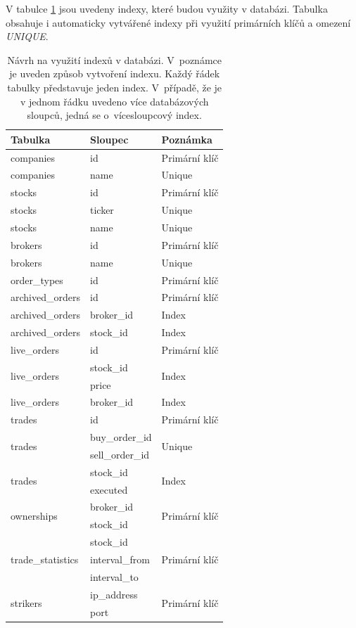\documentclass[thesis=M,czech]{FITthesis}[2012/06/26]
\begin{document}
V tabulce \ref{tab:dbindexes} jsou uvedeny indexy, které budou využity v databázi. Tabulka obsahuje i automaticky vytvářené indexy při využití 
primárních klíčů a omezení \textit{UNIQUE}.

\begin{table}\centering
	\begin{tabular}{| l | l | l |}\hline
		Tabulka		& Sloupec	& Poznámka		\tabularnewline \hline \hline
		companies		& id		& Primární klíč	\tabularnewline \hline
		companies		& name	& Unique		\tabularnewline \hline
		stocks			& id		& Primární klíč	\tabularnewline \hline
		stocks			& ticker	& Unique		\tabularnewline \hline
		stocks			& name	& Unique		\tabularnewline \hline
		brokers		& id		& Primární klíč	\tabularnewline \hline
		brokers		& name	& Unique		\tabularnewline \hline
		order\_types		& id		& Primární klíč	\tabularnewline \hline
		archived\_orders	& id		& Primární klíč	\tabularnewline \hline
		archived\_orders	& broker\_id	& Index		\tabularnewline \hline
		archived\_orders	& stock\_id	& Index		\tabularnewline \hline
		live\_orders		& id		& Primární klíč	\tabularnewline \hline
		\multirow{2}{*}{live\_orders}	& stock\_id	& \multirow{2}{*}{Index}	\tabularnewline 
		 					& price	& 				\tabularnewline \hline
		live\_orders		& broker\_id	& Index		\tabularnewline \hline
		trades			& id		& Primární klíč	\tabularnewline \hline
		\multirow{2}{*}{trades}	& buy\_order\_id	& \multirow{2}{*}{Unique}	\tabularnewline 
		 				& sell\_order\_id	& 					\tabularnewline \hline
		\multirow{2}{*}{trades}	& stock\_id		& \multirow{2}{*}{Index}		\tabularnewline 
		 				& executed		& 					\tabularnewline \hline
		\multirow{2}{*}{ownerships}	& broker\_id	& \multirow{2}{*}{Primární klíč}	\tabularnewline 
		 					& stock\_id	& 					\tabularnewline \hline
		\multirow{3}{*}{trade\_statistics}	& stock\_id		& \multirow{3}{*}{Primární klíč}	\tabularnewline 
		 						& interval\_from	& 					\tabularnewline
		 						& interval\_to	& 					\tabularnewline \hline
		\multirow{2}{*}{strikers}	& ip\_address	& \multirow{2}{*}{Primární klíč}	\tabularnewline 
		 				& port			& 					\tabularnewline \hline
	\end{tabular}
	\caption[Navržené indexy]{Návrh na využití indexů v databázi. V~poznámce je uveden způsob vytvoření indexu. Každý řádek tabulky 
						představuje jeden index. V~případě, že je v jednom řádku uvedeno více databázových sloupců, jedná se 
						o~vícesloupcový index.}
	\label{tab:dbindexes}
\end{table}

\end{document}
